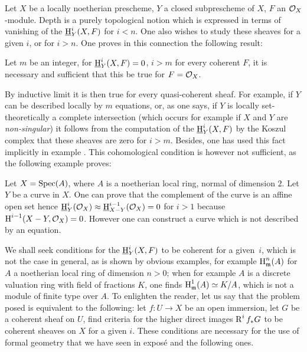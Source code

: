 \begin{remark} \label{III.3.11}
Let $X$ be a locally noetherian prescheme, $Y$ a closed subprescheme of $X$, $F$ an $\mathcal{O}_X$-module. Depth is a purely topological notion which is expressed in terms of vanishing of the $\operatorname{\underline{H}}_Y^i(X, F)$ for $i<n$. One also wishes to study these sheaves for a given $i$, or for $i>n$. One proves in this connection the following result:
\end{remark}

\begin{lemma} \label{III.3.12}
Let $m$ be an integer, for $\operatorname{\underline{H}}_Y^i(X, F)=0$, $i>m$ for every coherent $F$, it is necessary and sufficient that this be true for $F=\mathcal{O}_X$.
\end{lemma}

By inductive limit it is then true for every quasi-coherent sheaf. For example, if $Y$ can be described locally by $m$ equations, or, as one says, if $Y$ is locally set-theoretically a complete intersection (which occurs for example if $X$ and $Y$ are \emph{non-singular}) it follows from the computation of the $\operatorname{\underline{H}}_Y^i(X, F)$ by the Koszul complex that these sheaves are zero for $i>m$. Besides, one has used this fact implicitly in example . This cohomological condition is however not sufficient, as the following example proves:

\begin{example} \label{III.3.13}
Let $X=\operatorname{Spec} (A)$, where $A$ is a noetherian local ring, normal of dimension $2$. Let $Y$ be a curve in $X$. One can prove that the complement of the curve is an affine open set hence $\operatorname{\underline{H}}_Y^i(\mathcal{O}_X) \approx \operatorname{\underline{H}}_{X-Y}^{i-1}(\mathcal{O}_X)=0$ for $i>1$ because $\operatorname{H}^{i-1}(X-Y, \mathcal{O}_X)=0$. However one can construct a curve which is not described by an equation.
\end{example}

We shall seek conditions for the $\operatorname{\underline{H}}_Y^i(X, F)$ to be coherent for a given~$i$, which is not the case in general, as is shown by obvious examples, for example $\operatorname{H}_{\mathfrak{m}}^n(A)$ for $A$ a noetherian local ring of dimension $n>0$; when for example $A$ is a discrete valuation ring with field of fractions $K$, one finds $\operatorname{H}_{\mathfrak{m}}^1(A) \simeq K/A$, which is not a module of finite type over $A$. To enlighten the reader, let us say that the problem posed is equivalent to the following: let $f\colon U\to X$ be an open immersion, let $G$ be a coherent sheaf on $U$, find criteria for the higher direct images $\operatorname{R}^i f_* G$ to be coherent sheaves on $X$ for a given $i$. These conditions are necessary for the use of formal geometry that we have seen in expos\'e  and the following ones.
